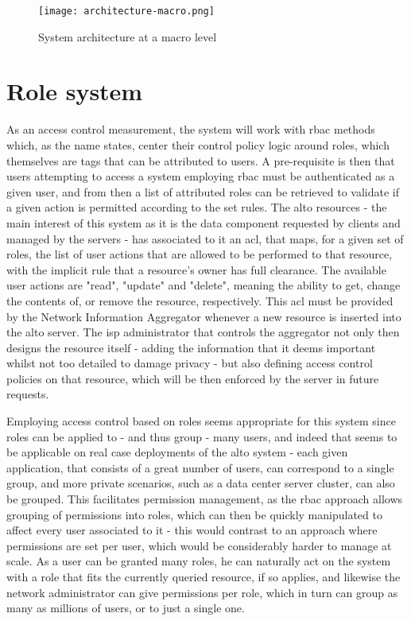 
\begin{figure}[H]
        \centering
        \texttt{[image: architecture-macro.png]}
        \caption{System architecture at a macro level}
        \label{fig:macro-architecture}
\end{figure}

\section{Role system}
\label{sec:system-roles}

    As an access control measurement, the system will work with \gls{rbac} methods which, as the name states, center their control policy logic around roles, which themselves are tags that can be attributed to users.
    A pre-requisite is then that users attempting to access a system employing \gls{rbac} must be authenticated as a given user, and from then a list of attributed roles can be retrieved to validate if a given action is permitted according to the set rules.
    The \gls{alto} resources - the main interest of this system as it is the data component requested by clients and managed by the servers - has associated to it an \gls{acl}, that maps, for a given set of roles, the list of user actions that are allowed to be performed to that resource, with the implicit rule that a resource's owner has full clearance.
    The available user actions are "read", "update" and "delete", meaning the ability to get, change the contents of, or remove the resource, respectively.
    This \gls{acl} must be provided by the Network Information Aggregator whenever a new resource is inserted into the \gls{alto} server.
    The \gls{isp} administrator that controls the aggregator not only then designs the resource itself - adding the information that it deems important whilst not too detailed to damage privacy - but also defining access control policies on that resource, which will be then enforced by the server in future requests.

    Employing access control based on roles seems appropriate for this system since roles can be applied to - and thus group - many users, and indeed that seems to be applicable on real case deployments of the \gls{alto} system - each given application, that consists of a great number of users, can correspond to a single group, and more private scenarios, such as a data center server cluster, can also be grouped.
    This facilitates permission management, as the \gls{rbac} approach allows grouping of permissions into roles, which can then be quickly manipulated to affect every user associated to it - this would contrast to an approach where permissions are set per user, which would be considerably harder to manage at scale.
    As a user can be granted many roles, he can naturally act on the system with a role that fits the currently queried resource, if so applies, and likewise the network administrator can give permissions per role, which in turn can group as many as millions of users, or to just a single one.

